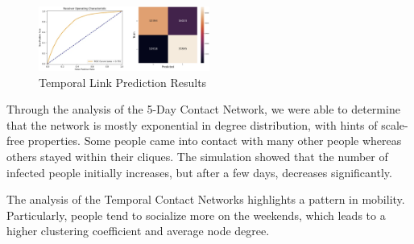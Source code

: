 \documentclass[times, 10pt,twocolumn]{article}
\begin{document}
\begin{figure}[h]
    \centering
    \includegraphics[width=0.5\textwidth]{imgs/temporal_link_prediction_results.png}
    \caption{Temporal Link Prediction Results} 
    \label{fig:temporal_link_prediction_results}
\end{figure}





Through the analysis of the 5-Day Contact Network, we were able to determine that the network is mostly exponential in degree distribution, with hints of scale-free properties. Some people came into contact with many other people whereas others stayed within their cliques. The simulation showed that the number of infected people initially increases, but after a few days, decreases significantly.

The analysis of the Temporal Contact Networks highlights a pattern in mobility. Particularly, people tend to socialize more on the weekends, which leads to a higher clustering coefficient and average node degree.
\end{document}
